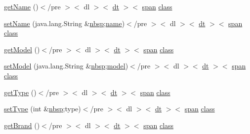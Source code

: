\begin{DoxyCompactItemize}
\hyperlink{_station_8html_aa32a9cfdf72a88fdec3470b4a9fb1517}{get\-Name} ()$<$/pre $>$$<$ dl $>$$<$ \hyperlink{stylesheet_8css_a107565fb4039d33b041380d6e0ea1d80}{dt} $>$$<$ \hyperlink{stylesheet_8css_a8343996ebcf16220b04e54659aac31cc}{span} \hyperlink{_tools_8html_acf06f836132665ba8114f5a414c2403f}{class}
\item 
\hyperlink{_station_8html_a67da6c6420602717ea42bcaad788568e}{set\-Name} (java.\-lang.\-String \&\hyperlink{_tools_8html_aef915316f784c9063d942974538301a6}{nbsp};\hyperlink{_cloudia_d_b_8html_ab74e6bf80237ddc4109968cedc58c151}{name})$<$/pre $>$$<$ dl $>$$<$ \hyperlink{stylesheet_8css_a107565fb4039d33b041380d6e0ea1d80}{dt} $>$$<$ \hyperlink{stylesheet_8css_a8343996ebcf16220b04e54659aac31cc}{span} \hyperlink{_tools_8html_acf06f836132665ba8114f5a414c2403f}{class}
\item 
\hyperlink{_station_8html_ad119337c5190337d452cfa40c36113d7}{get\-Model} ()$<$/pre $>$$<$ dl $>$$<$ \hyperlink{stylesheet_8css_a107565fb4039d33b041380d6e0ea1d80}{dt} $>$$<$ \hyperlink{stylesheet_8css_a8343996ebcf16220b04e54659aac31cc}{span} \hyperlink{_tools_8html_acf06f836132665ba8114f5a414c2403f}{class}
\item 
\hyperlink{_station_8html_af810be0552fab4c692f8f493a3836d90}{set\-Model} (java.\-lang.\-String \&\hyperlink{_tools_8html_aef915316f784c9063d942974538301a6}{nbsp};\hyperlink{_cloudia_d_b_8html_a508cc3106d2c29fe07dc87cbe3ea6927}{model})$<$/pre $>$$<$ dl $>$$<$ \hyperlink{stylesheet_8css_a107565fb4039d33b041380d6e0ea1d80}{dt} $>$$<$ \hyperlink{stylesheet_8css_a8343996ebcf16220b04e54659aac31cc}{span} \hyperlink{_tools_8html_acf06f836132665ba8114f5a414c2403f}{class}
\item 
\hyperlink{_station_8html_a94440060d6d17a07a0337216ce213a5c}{get\-Type} ()$<$/pre $>$$<$ dl $>$$<$ \hyperlink{stylesheet_8css_a107565fb4039d33b041380d6e0ea1d80}{dt} $>$$<$ \hyperlink{stylesheet_8css_a8343996ebcf16220b04e54659aac31cc}{span} \hyperlink{_tools_8html_acf06f836132665ba8114f5a414c2403f}{class}
\item 
\hyperlink{_station_8html_a6cca49b115a815513a93cfa4a4c5d6f5}{set\-Type} (int \&\hyperlink{_tools_8html_aef915316f784c9063d942974538301a6}{nbsp};type)$<$/pre $>$$<$ dl $>$$<$ \hyperlink{stylesheet_8css_a107565fb4039d33b041380d6e0ea1d80}{dt} $>$$<$ \hyperlink{stylesheet_8css_a8343996ebcf16220b04e54659aac31cc}{span} \hyperlink{_tools_8html_acf06f836132665ba8114f5a414c2403f}{class}
\item 
\hyperlink{_station_8html_a2e8646875711cb69aeee656c2348c4e3}{get\-Brand} ()$<$/pre $>$$<$ dl $>$$<$ \hyperlink{stylesheet_8css_a107565fb4039d33b041380d6e0ea1d80}{dt} $>$$<$ \hyperlink{stylesheet_8css_a8343996ebcf16220b04e54659aac31cc}{span} \hyperlink{_tools_8html_acf06f836132665ba8114f5a414c2403f}{class}
$$
\end{DoxyCompactItemize}
